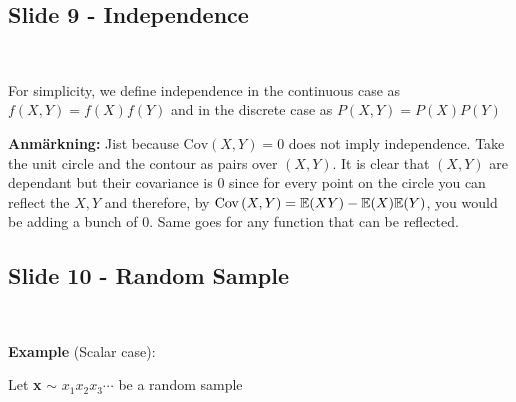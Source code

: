 \subsection{Slide 9 - Independence}\hfill\\
\par\bigskip
\noindent For simplicity, we define independence in the continuous case as $f(X,Y) = f(X)f(Y)$ and in the discrete case as $P(X,Y) = P(X)P(Y)$
\par\bigskip
\noindent\textbf{Anmärkning:} Jist because $\text{Cov}\left(X,Y\right)=0$ does not imply independence. Take the unit circle and the contour as pairs over $(X,Y)$. It is clear that $(X,Y)$ are dependant but their covariance is 0 since for every point on the circle you can reflect the $X,Y$ and therefore, by $\text{Cov}\left(X,Y\right) = \mathbb{E}(XY)-\mathbb{E}(X)\mathbb{E}(Y)$, you would be adding a bunch of 0. Same goes for any function that can be reflected.
\par\bigskip
\subsection{Slide 10 - Random Sample}\hfill\\
\par\bigskip
\noindent \textbf{Example} (Scalar case):\par
\noindent Let \textbf{x} $\sim$ \textbf{$x_1 x_2 x_3 \cdots$} be a random sample 
